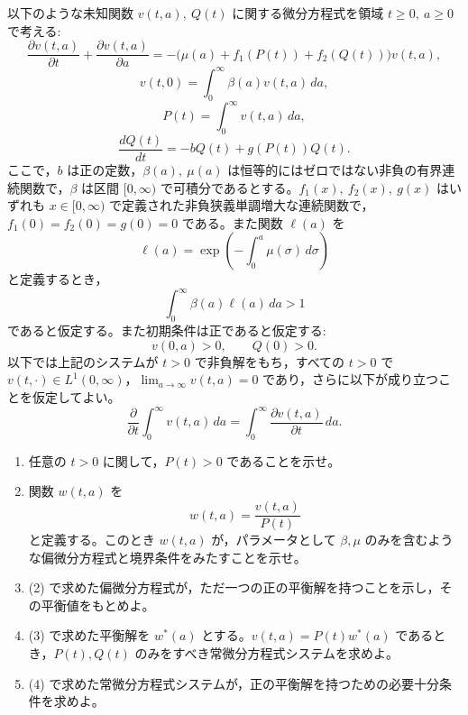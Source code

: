 \documentclass[12pt]{jlreq}
\newcommand{\dd}{\,d}
\begin{document}
以下のような未知関数 \(v(t,a),\ Q(t)\) に関する微分方程式を領域 \(t\ge0,\ a\ge0\) で考える:
\[
  \frac{\partial v(t,a)}{\partial t}+\frac{\partial v(t,a)}{\partial a}
  =-\bigl(\mu(a)+f_1(P(t))+f_2(Q(t))\bigr)v(t,a),
\]
\[
  v(t,0)=\int_0^\infty \beta(a)v(t,a)\dd a,
\]
\[
  P(t)=\int_0^\infty v(t,a)\dd a,
\]
\[
  \frac{dQ(t)}{dt}=-bQ(t)+g(P(t))Q(t).
\]
ここで，\(b\) は正の定数，\(\beta(a),\ \mu(a)\) は恒等的にはゼロではない非負の有界連続関数で，\(\beta\) は区間 \([0,\infty)\) で可積分であるとする。\(f_1(x),\ f_2(x),\ g(x)\) はいずれも \(x\in[0,\infty)\) で定義された非負狭義単調増大な連続関数で，\(f_1(0)=f_2(0)=g(0)=0\) である。また関数 \(\ell(a)\) を
\[
  \ell(a)=\exp\left(-\int_0^a\mu(\sigma)\dd\sigma\right)
\]
と定義するとき，
\[
  \int_0^\infty \beta(a)\ell(a)\dd a>1
\]
であると仮定する。また初期条件は正であると仮定する:
\[
  v(0,a)>0,\qquad Q(0)>0.
\]
以下では上記のシステムが \(t>0\) で非負解をもち，すべての \(t>0\) で \(v(t,\cdot)\in L^1(0,\infty)\)，\(\lim_{a\to\infty}v(t,a)=0\) であり，さらに以下が成り立つことを仮定してよい。
\[
  \frac{\partial}{\partial t}\int_0^\infty v(t,a)\dd a
  =
  \int_0^\infty \frac{\partial v(t,a)}{\partial t}\dd a.
\]

\begin{enumerate}
  \item 任意の \(t>0\) に関して，\(P(t)>0\) であることを示せ。
  \item 関数 \(w(t,a)\) を
  \[
    w(t,a)=\frac{v(t,a)}{P(t)}
  \]
  と定義する。このとき \(w(t,a)\) が，パラメータとして \(\beta,\mu\) のみを含むような偏微分方程式と境界条件をみたすことを示せ。
  \item (2) で求めた偏微分方程式が，ただ一つの正の平衡解を持つことを示し，その平衡値をもとめよ。
  \item (3) で求めた平衡解を \(w^*(a)\) とする。\(v(t,a)=P(t)w^*(a)\) であるとき，\(P(t),Q(t)\) のみをすべき常微分方程式システムを求めよ。
  \item (4) で求めた常微分方程式システムが，正の平衡解を持つための必要十分条件を求めよ。
\end{enumerate}
\end{document}
